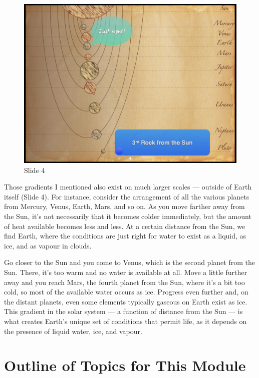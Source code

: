 \documentclass[
  11pt,
]{book}
\begin{document}
\begin{figure}[ht]
\centering
\includegraphics[width=0.8\linewidth]{../images/BDC334/BDC334-004.jpeg}
\caption*{Slide 4}
\end{figure}

Those gradients I mentioned also exist on much larger scales --- outside
of Earth itself (Slide 4). For instance, consider the arrangement of all
the various planets from Mercury, Venus, Earth, Mars, and so on. As you
move farther away from the Sun, it's not necessarily that it becomes
colder immediately, but the amount of heat available becomes less and
less. At a certain distance from the Sun, we find Earth, where the
conditions are just right for water to exist as a liquid, as ice, and as
vapour in clouds.

Go closer to the Sun and you come to Venus, which is the second planet
from the Sun. There, it's too warm and no water is available at all.
Move a little further away and you reach Mars, the fourth planet from
the Sun, where it's a bit too cold, so most of the available water
occurs as ice. Progress even further and, on the distant planets, even
some elements typically gaseous on Earth exist as ice. This gradient in
the solar system --- a function of distance from the Sun --- is what
creates Earth's unique set of conditions that permit life, as it depends
on the presence of liquid water, ice, and vapour.

\section{Outline of Topics for This
Module}\label{outline-of-topics-for-this-module}
\end{document}
